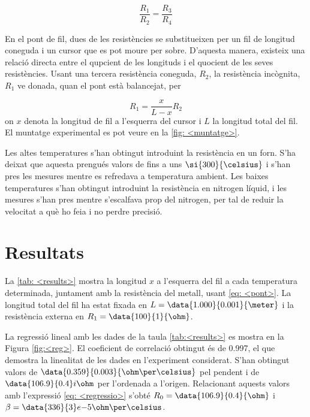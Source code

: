 \begin{equation}
\frac{R_1}{R_2}=\frac{R_3}{R_4}
\end{equation} 

En el pont de fil, dues de les resistències se substitueixen per un fil de longitud coneguda i un cursor que es pot moure per sobre. D'aquesta manera, existeix una relació directa entre el qupcient de les longituds i el quocient de les seves resistències. Usant una tercera resistència coneguda, $R_2$, la resistència incògnita, $R_1$ ve donada, quan el pont està balancejat, per

\begin{equation}\label{eq: <pont>}
R_1=\frac{x}{L-x}R_2
\end{equation}
on $x$ denota la longitud de fil a l'esquerra del cursor i $L$ la longitud total del fil. El muntatge experimental es pot veure en la \cref{fig: <muntatge>}. 

Les altes temperatures s'han obtingut introduint la resistència en un forn. S'ha deixat que aquesta prengués valors de fins a uns $\si{300}{\celsius}$ i s'han pres les mesures mentre es refredava a temperatura ambient. Les baixes temperatures s'han obtingut introduint la resistència en nitrogen líquid, i les mesures s'han pres mentre s'escalfava prop del nitrogen, per tal de reduir la velocitat a què ho feia i no perdre precisió.


\section{Resultats}

La \ref{tab: <results>} mostra la longitud $x$ a l'esquerra del fil a cada temperatura determinada, juntament amb la resistència del metall, usant \ref{eq: <pont>}. La longitud total del fil ha estat fixada en $L=\data{1.000}{0.001}{\meter}$ i la resistència externa en $R_1=\data{100}{1}{\ohm}$.

La regressió lineal amb les dades de la taula \cref{tab:<results>} es mostra en la Figura \ref{fig:<reg>}. El coeficient de correlació obtingut és de 0.997, el que demostra la linealitat de les dades en l'experiment considerat. S'han obtingut valors de $\data{0.359}{0.003}{\ohm\per\celsius}$ pel pendent i de $\data{106.9}{0.4}i{\ohm}$ per l'ordenada a l'origen. Relacionant aquests valors amb l'expressió \cref{eq: <regressio>} s'obté $R_0=\data{106.9}{0.4}{\ohm}$ i $\beta=\data{336}{3}e{-5}{\ohm\per\celsius}$.


